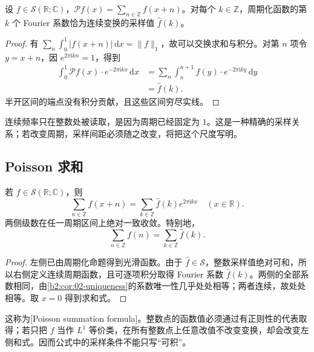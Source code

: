 \begin{proposition}\label{b2:prop:06-periodic-coefficients}
设 \(f\in\mathcal S(\mathbb R;\mathbb C)\)，\(\mathcal Pf(x)=\sum_{n\in\mathbb Z}f(x+n)\)。对每个 \(k\in\mathbb Z\)，周期化函数的第 \(k\) 个 Fourier 系数恰为连续变换的采样值 \(\widehat f(k)\)。
\end{proposition}
\begin{proof}
有 \(\sum_n\int_0^1|f(x+n)|\,\mathrm{d}x=\|f\|_1\)，故可以交换求和与积分。对第 \(n\) 项令 \(y=x+n\)，因 \(e^{2\pi\mathrm{i}kn}=1\)，得到
\[
 \begin{aligned}
 \int_0^1\mathcal Pf(x)\cdot e^{-2\pi\mathrm{i}kx}\,\mathrm{d}x
 &=\sum_n\int_n^{n+1}f(y)\cdot e^{-2\pi\mathrm{i}ky}\,\mathrm{d}y\\
 &=\widehat f(k).
 \end{aligned}
\]
半开区间的端点没有积分贡献，且这些区间穷尽实线。
\end{proof}

连续频率只在整数处被读取，是因为周期已经固定为 \(1\)。这是一种精确的采样关系；若改变周期，采样间距必须随之改变，将把这个尺度写明。

\subsection{Poisson 求和}
\label{b2:subsec:060103}

\begin{theorem}[Poisson 求和]\label{b2:thm:06-poisson}
若 \(f\in\mathcal S(\mathbb R;\mathbb C)\)，则
\begin{equation}\label{b2:eq:06-poisson-periodic}
 \sum_{n\in\mathbb Z}f(x+n)
 =\sum_{k\in\mathbb Z}\widehat f(k)e^{2\pi\mathrm{i}kx}
 \quad(x\in\mathbb R).
\end{equation}
两侧级数在任一周期区间上绝对一致收敛。特别地，
\[
 \sum_{n\in\mathbb Z}f(n)=\sum_{k\in\mathbb Z}\widehat f(k).
\]
\end{theorem}
\begin{proof}
左侧已由周期化命题得到光滑函数。由于 \(\widehat f\in\mathcal S\)，整数采样值绝对可和，所以右侧定义连续周期函数，且可逐项积分取得 Fourier 系数 \(\widehat f(k)\)。两侧的全部系数相同，由\cref{b2:cor:02-uniqueness}的系数唯一性几乎处处相等；两者连续，故处处相等。取 \(x=0\) 得到求和式。
\end{proof}

这称为[Poisson summation formula]。整数点的函数值必须通过有正则性的代表取得；若只把 \(f\) 当作 \(L^1\) 等价类，在所有整数点上任意改值不改变变换，却会改变左侧和式。因而公式中的采样条件不能只写“可积”。

